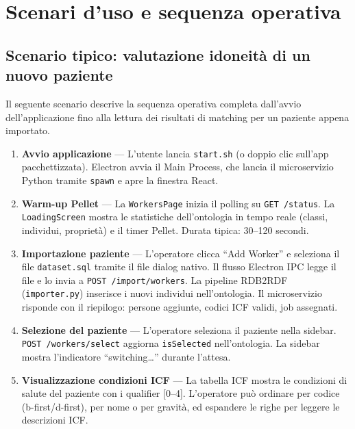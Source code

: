 \documentclass[a4paper,12pt]{article}
\begin{document}
\section{Scenari d'uso e sequenza operativa}

\subsection{Scenario tipico: valutazione idoneit\`{a} di un nuovo paziente}

Il seguente scenario descrive la sequenza operativa completa dall'avvio
dell'applicazione fino alla lettura dei risultati di matching per un
paziente appena importato.

\begin{enumerate}
  \item \textbf{Avvio applicazione} --- L'utente lancia \texttt{start.sh}
        (o doppio clic sull'app pacchettizzata). Electron avvia il Main
        Process, che lancia il microservizio Python tramite \texttt{spawn}
        e apre la finestra React.

  \item \textbf{Warm-up Pellet} --- La \texttt{WorkersPage} inizia il
        polling su \texttt{GET /status}. La \texttt{LoadingScreen} mostra
        le statistiche dell'ontologia in tempo reale (classi, individui,
        propriet\`{a}) e il timer Pellet. Durata tipica: 30--120 secondi.

  \item \textbf{Importazione paziente} --- L'operatore clicca
        ``Add Worker'' e seleziona il file \texttt{dataset.sql} tramite
        il file dialog nativo. Il flusso Electron IPC legge il file e lo
        invia a \texttt{POST /import/workers}. La pipeline RDB2RDF
        (\texttt{importer.py}) inserisce i nuovi individui nell'ontologia.
        Il microservizio risponde con il riepilogo: persone aggiunte,
        codici ICF validi, job assegnati.

  \item \textbf{Selezione del paziente} --- L'operatore seleziona il
        paziente nella sidebar. \texttt{POST /workers/select} aggiorna
        \texttt{isSelected} nell'ontologia. La sidebar mostra l'indicatore
        ``switching\ldots'' durante l'attesa.

  \item \textbf{Visualizzazione condizioni ICF} --- La tabella ICF mostra
        le condizioni di salute del paziente con i qualifier [0--4]. L'operatore
        pu\`{o} ordinare per codice (b-first/d-first), per nome o per
        gravit\`{a}, ed espandere le righe per leggere le descrizioni ICF.


\end{enumerate}
\end{document}
